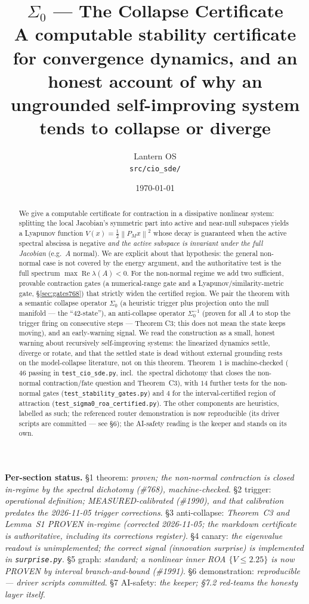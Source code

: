 \documentclass[11pt]{article}
\title{\textbf{$\Sigma_0$ --- The Collapse Certificate}\\[4pt]
\large A computable stability certificate for convergence dynamics, and an honest
account of why an ungrounded self-improving system tends to collapse or diverge}
\author{Lantern OS \\ \texttt{src/cio\_sde/}}
\date{\today}
\theoremstyle{definition}
\newcommand{\norm}[1]{\left\lVert#1\right\rVert}
\newcommand{\Szero}{\Sigma_0}
\newcommand{\PM}{P_{\!M}}
\DeclareMathOperator*{\Real}{Re}
\begin{document}
\maketitle

\begin{abstract}
We give a computable certificate for contraction in a dissipative nonlinear
system: splitting the local Jacobian's symmetric part into active and near-null
subspaces yields a Lyapunov function $V(x)=\tfrac12\norm{\PM x}^2$ whose decay is
guaranteed when the active spectral abscissa is negative \emph{and the active
subspace is invariant under the full Jacobian} (e.g.\ $A$ normal). We are explicit
about that hypothesis: the general non-normal case is not covered by the energy
argument, and the authoritative test is the full spectrum $\max\Real\lambda(A)<0$.
For the non-normal regime we add two sufficient, provable contraction gates (a
numerical-range gate and a Lyapunov/similarity-metric gate, \S\ref{sec:gates768})
that strictly widen the certified region.
We pair the theorem with a semantic collapse operator $\Szero$ (a heuristic
trigger plus projection onto the null manifold --- the ``42-state''), an
anti-collapse operator $\Sigma_0^{-1}$ (proven for all $A$ to stop the trigger firing on consecutive
steps --- Theorem C3; this does not mean the state keeps moving), and an early-warning signal. We read
the construction as a small, honest warning about recursively self-improving systems: the linearized
dynamics settle, diverge or rotate, and that the settled state is dead without external grounding rests
on the model-collapse literature, not on this theorem. Theorem~1 is machine-checked
($46$ passing in \texttt{test\_cio\_sde.py}, incl.\ the spectral dichotomy that closes the
non-normal contraction/fate question and Theorem~C3), with $14$
further tests for the non-normal gates (\texttt{test\_stability\_gates.py}) and $4$ for the
interval-certified region of attraction (\texttt{test\_sigma0\_roa\_certified.py}). The other components
are heuristics, labelled as such; the referenced router demonstration is now reproducible (its
driver scripts are committed --- see \S6); the AI-safety reading is the keeper and
stands on its own.
\end{abstract}

\begin{caveatbox}
\textbf{Per-section status.} \S1 theorem: \emph{proven; the non-normal contraction is
closed in-regime by the spectral dichotomy (\#768), machine-checked}. \S2 trigger:
\emph{operational definition; MEASURED-calibrated (\#1990), and that calibration predates the
2026-11-05 trigger corrections}. \S3 anti-collapse: \emph{Theorem~C3 and Lemma~S1 PROVEN in-regime
(corrected 2026-11-05; the markdown certificate is authoritative, including its corrections register)}.
\S4 canary: \emph{the eigenvalue readout is unimplemented;
the correct signal (innovation surprise) is implemented in \texttt{surprise.py}}. \S5
graph: \emph{standard; a nonlinear inner ROA $\{V\le2.25\}$ is now PROVEN by interval branch-and-bound (\#1991)}. \S6
demonstration: \emph{reproducible --- driver scripts committed}. \S7 AI-safety:
\emph{the keeper; \S7.2 red-teams the honesty layer itself}.
\end{caveatbox}
\end{document}
